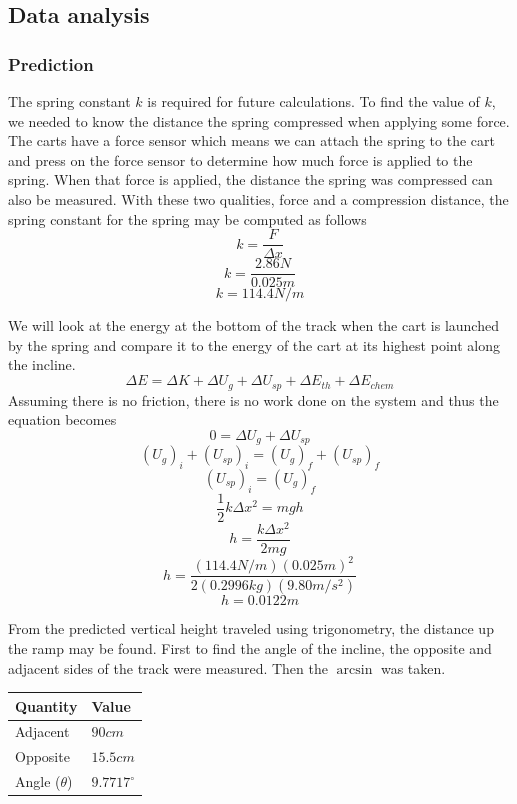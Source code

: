 \documentclass[11pt, letterpaper, includehead]{article}
\begin{document}
\subsection{Data analysis}
\subsubsection{Prediction}
The spring constant $k$ is required for future calculations. To find the value of $k$, we needed to know the distance
the spring compressed when applying some force. The carts have a force sensor which means we can attach the spring to the cart and press 
on the force sensor to determine how much force is applied to the spring. When that force is applied, the distance the spring was 
compressed can also be measured. With these two qualities, force and a compression distance, the spring constant for the spring may be computed as follows
$$k = \frac{F}{\Delta x}$$
$$k = \frac{2.86 N}{0.025m}$$
$$\boxed{k = 114.4N/m}$$


We will look at the energy at the bottom of the track when the cart is launched by 
the spring and compare it to the energy of the cart at its highest point along the incline.
$$\Delta E = \Delta K + \Delta U_{g} + \Delta U_{sp} + \Delta E_{th} + \Delta E_{chem}$$
Assuming there is no friction, there is no work done on the system and thus
the equation becomes 
$$0 = \Delta U_{g} + \Delta U_{sp}$$
$$(U_{g})_i + (U_{sp})_i = (U_{g})_f + (U_{sp})_f$$
$$(U_{sp})_i = (U_{g})_f$$
$$\frac{1}{2}k\Delta x^2 = mgh$$
$$h = \frac{k\Delta x^2}{2mg}$$
$$h = \frac{(114.4 N/m) (0.025m)^2}{2 (0.2996kg)(9.80m/s^2)}$$
$$\boxed{h = 0.0122m}$$

From the predicted vertical height traveled using trigonometry, the distance up the ramp may be found.
First to find the angle of the incline, the opposite and adjacent sides of the track were measured. Then
the $\arcsin$ was taken.

\begin{center} 
  \begin{tabular}{|  m{3cm} | m{3cm} | } 
    \hline 
    \textbf{Quantity} & \textbf{Value}\\
    \hline
    Adjacent & $90cm$ \\ 
    \hline
    Opposite & $15.5cm$ \\ 
    \hline
    Angle ($\theta$) & $9.7717^{\circ}$ \\ 
    \hline      
  \end{tabular} 
\end{center}
\end{document}
